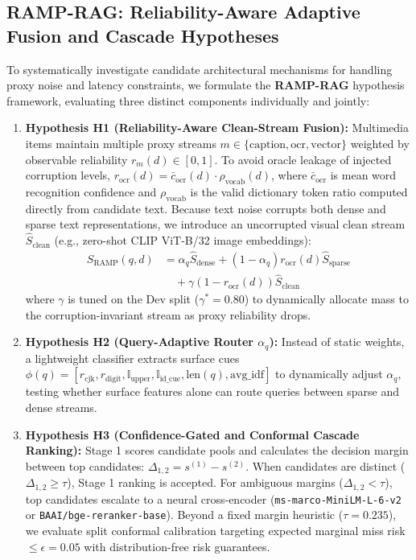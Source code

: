 \documentclass[conference]{IEEEtran}
\begin{document}
\subsection{RAMP-RAG: Reliability-Aware Adaptive Fusion and Cascade Hypotheses}
\label{sec:ramp_rag}
To systematically investigate candidate architectural mechanisms for handling proxy noise and latency constraints, we formulate the \textbf{RAMP-RAG} hypothesis framework, evaluating three distinct components individually and jointly:
\begin{enumerate}
    \setlength{\itemsep}{1pt plus 0.5pt}
    \setlength{\parskip}{0pt}
    \item \textbf{Hypothesis H1 (Reliability-Aware Clean-Stream Fusion):} Multimedia items maintain multiple proxy streams $m \in \{\text{caption}, \text{ocr}, \text{vector}\}$ weighted by observable reliability $r_m(d) \in [0, 1]$. To avoid oracle leakage of injected corruption levels, $r_{\text{ocr}}(d) = \bar{c}_{\text{ocr}}(d) \cdot \rho_{\text{vocab}}(d)$, where $\bar{c}_{\text{ocr}}$ is mean word recognition confidence and $\rho_{\text{vocab}}$ is the valid dictionary token ratio computed directly from candidate text. Because text noise corrupts both dense and sparse text representations, we introduce an uncorrupted visual clean stream $\hat{S}_{\text{clean}}$ (e.g., zero-shot CLIP ViT-B/32 image embeddings):
    \begin{equation}
    \begin{aligned}
        S_{\text{RAMP}}(q, d) &= \alpha_q \hat{S}_{\text{dense}} + (1 - \alpha_q) r_{\text{ocr}}(d) \hat{S}_{\text{sparse}} \\
        &\quad + \gamma (1 - r_{\text{ocr}}(d)) \hat{S}_{\text{clean}}
    \end{aligned}
    \label{eq:ramp}
    \end{equation}
    where $\gamma$ is tuned on the Dev split ($\gamma^* = 0.80$) to dynamically allocate mass to the corruption-invariant stream as proxy reliability drops.
    \item \textbf{Hypothesis H2 (Query-Adaptive Router $\alpha_q$):} Instead of static weights, a lightweight classifier extracts surface cues $\phi(q) = [r_{\text{cjk}}, r_{\text{digit}}, \mathbb{I}_{\text{upper}}, \mathbb{I}_{\text{id\_cue}}, \text{len}(q), \text{avg\_idf}]$ to dynamically adjust $\alpha_q$, testing whether surface features alone can route queries between sparse and dense streams.
    \item \textbf{Hypothesis H3 (Confidence-Gated and Conformal Cascade Ranking):} Stage 1 scores candidate pools and calculates the decision margin between top candidates: $\Delta_{1,2} = s^{(1)} - s^{(2)}$. When candidates are distinct ($\Delta_{1,2} \ge \tau$), Stage 1 ranking is accepted. For ambiguous margins ($\Delta_{1,2} < \tau$), top candidates escalate to a neural cross-encoder (\texttt{ms-marco-MiniLM-L-6-v2} or \texttt{BAAI/bge-reranker-base}). Beyond a fixed margin heuristic ($\tau = 0.235$), we evaluate split conformal calibration targeting expected marginal miss risk $\le \epsilon = 0.05$ with distribution-free risk guarantees.
\end{enumerate}
\end{document}
